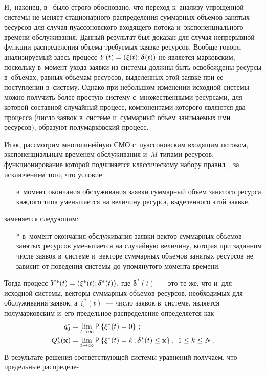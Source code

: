 \begin{multicols}{2}
И,~наконец, в~\cite{Naumov_3_2016} было строго обосновано, что переход к~анализу 
упрощенной сис\-те\-мы не меняет стационарного распределения суммарных объемов 
занятых ресурсов для случая пуассоновского входящего потока и~экспоненциального 
времени обслуживания. Данный результат был доказан для случая непрерывной 
функции распределения объема требуемых заявке ресурсов.
Вообще говоря, анализируемый здесь процесс 
$Y(t)\hm=(\xi(t);\boldsymbol{\delta}(t))$ не является марковским, поскольку 
в~момент ухода заявки из сис\-те\-мы должны быть освобождены ресурсы в~объемах, равных 
объемам ресурсов, выделенных этой заявке при ее поступлении в~сис\-те\-му. Однако 
при небольшом изменении исходной системы можно получить более простую систему 
с~множественными ресурсами, для которой составной случайный процесс, компонентами 
которого являются два процесса (число заявок в~сис\-те\-ме и~суммарный объем 
занимаемых ими ресурсов), образуют полумарковский процесс.

Итак, рассмотрим многолинейную СМО с~пуассоновским входящим потоком, 
экспоненциальным временем обслуживания и~$M$ типами ресурсов, функционирование 
которой подчиняется классическому набору правил~\cite{Ch_1},
за исключением того, что условие:
\begin{enumerate}
\item[] в~момент окончания обслуживания заявки суммарный объем занятого ресурса 
каждого типа уменьшается на величину ресурса, выделенного этой заявке,
\end{enumerate}
заменяется следующим:
\begin{enumerate}
\item[*] в~момент окончания обслуживания заявки вектор суммарных объемов занятых 
ресурсов уменьшается на случайную величину, которая при заданном числе заявок 
в~сис\-те\-ме и~векторе суммарных объемов занятых ресурсов не зависит от поведения 
сис\-те\-мы до упомянутого момента времени.
\end{enumerate}

Тогда процесс $Y^*(t)\hm=(\xi^*(t);\boldsymbol{\delta}^*(t)),$ где 
$\boldsymbol{\delta}^*(t)$~--- это те же,
что и~для исходной сис\-те\-мы, векторы суммарных объемов ресурсов, необходимых для
обслуживания заявок, а~$\xi^*(t)$~--- число заявок в~сис\-те\-ме, является 
полумарковским и~его предельное распределение определяется как
\begin{align*}
q_0^*&=\lim\limits_{t\rightarrow \infty}{\sf P}\left\{\xi^*(t)=0\right\}\,;
\\
Q_k^*(\mathbf{x})&=\lim\limits_{t\rightarrow \infty}{\sf P}\left\{\xi^*(t)=k\,; 
\boldsymbol{\delta}^*(t) \leq \mathbf{x}\right\}, \enskip 1\leq k\leq N\,.
\end{align*}
В результате решения соответствующей сис\-те\-мы урав\-не\-ний 
получаем, что предельные распределе-\linebreak\vspace*{-12pt}


\end{multicols}
